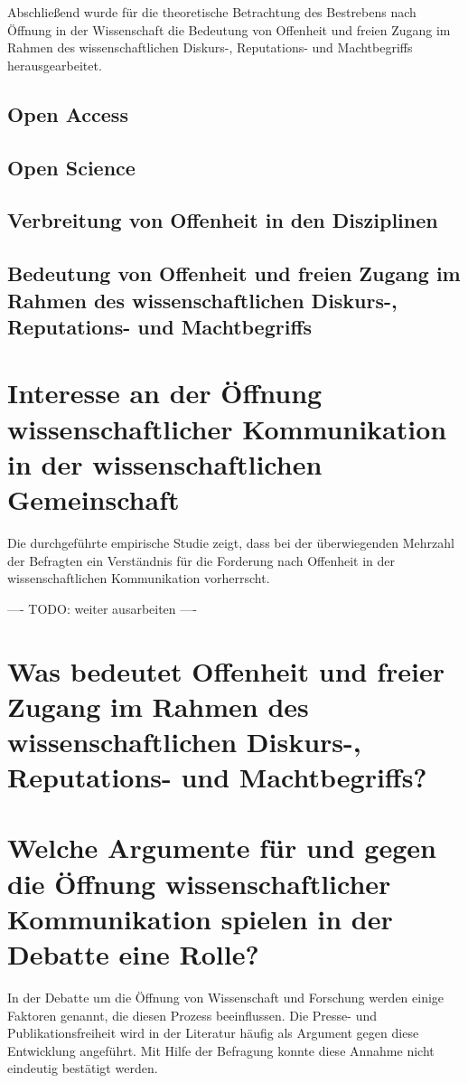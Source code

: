 Abschließend wurde für die theoretische Betrachtung des Bestrebens nach Öffnung in der Wissenschaft die Bedeutung von Offenheit und freien Zugang im Rahmen des wissenschaftlichen Diskurs-, Reputations- und Machtbegriffs herausgearbeitet.

\subsection{Open Access}

\subsection{Open Science}

\subsection{Verbreitung von Offenheit in den Disziplinen}

\subsection{Bedeutung von Offenheit und freien Zugang im Rahmen des wissenschaftlichen Diskurs-, Reputations- und Machtbegriffs}

\section{Interesse an der Öffnung wissenschaftlicher Kommunikation in der wissenschaftlichen Gemeinschaft}

Die durchgeführte empirische Studie zeigt, dass bei der überwiegenden Mehrzahl der Befragten ein Verständnis für die Forderung nach Offenheit in der wissenschaftlichen Kommunikation vorherrscht.

---- TODO: weiter ausarbeiten ----

\section{Was bedeutet Offenheit und freier Zugang im Rahmen des wissenschaftlichen Diskurs-, Reputations- und Machtbegriffs?}

\section{Welche Argumente für und gegen die Öffnung wissenschaftlicher Kommunikation spielen in der Debatte eine Rolle?}

In der Debatte um die Öffnung von Wissenschaft und Forschung werden einige Faktoren genannt, die diesen Prozess beeinflussen. Die Presse- und Publikationsfreiheit wird in der Literatur häufig als Argument gegen diese Entwicklung angeführt. Mit Hilfe der Befragung konnte diese Annahme nicht eindeutig bestätigt werden.

